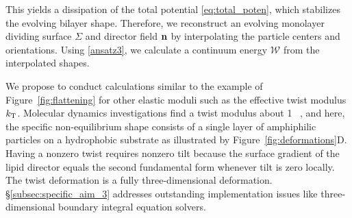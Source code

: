 This yields a dissipation of the total potential \eqref{eq:total_poten}, which
stabilizes the evolving bilayer shape.
Therefore, we reconstruct an evolving monolayer dividing surface $\Sigma$ and director field ${\bf n}$ by
interpolating the particle centers and orientations. Using \eqref{ansatz3}, we calculate a continuum energy $\mathcal{W}$ from the interpolated shapes.


%
%

%
We propose to conduct calculations similar to the example of Figure~\ref{fig:flattening}
for other elastic moduli such as the effective twist modulus $k_{\mathrm{T}}$.
Molecular dynamics investigations find a twist modulus about 1
\kBT~\cite{LeVeWa14}, and here, the specific non-equilibrium shape consists of
a single layer of amphiphilic particles on a hydrophobic substrate as
illustrated by Figure~\ref{fig:deformations}D. Having a nonzero twist
requires nonzero tilt because the surface gradient of the lipid
director equals the second fundamental form
whenever tilt is zero locally. The twist deformation is a fully
three-dimensional deformation. \S\ref{subsec:specific_aim_3} addresses outstanding implementation issues like three-dimensional boundary integral equation solvers.

